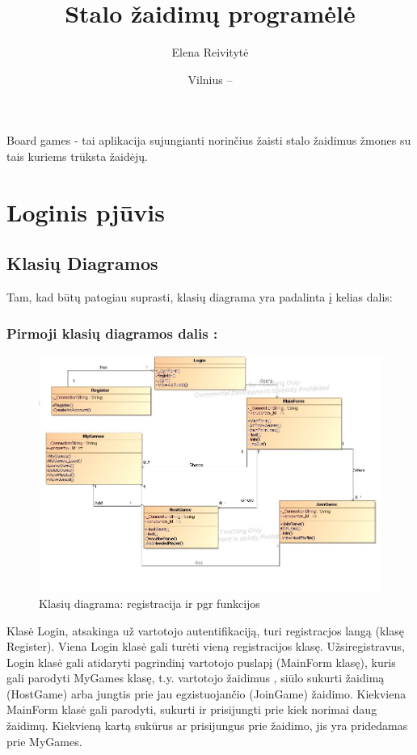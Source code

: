\documentclass{VUMIFPSkursinis}
\title{Stalo žaidimų programėlė}
\author{Elena Reivitytė}
\date{Vilnius – \the\year}
\begin{document}
\maketitle

\tableofcontents

Board games - tai aplikacija sujungianti norinčius žaisti stalo žaidimus žmones
su tais kuriems trūksta žaidėjų.
\section{Loginis pjūvis}
	\subsection{Klasių Diagramos}
			Tam, kad būtų patogiau suprasti, klasių diagrama yra padalinta į kelias dalis:
		\subsubsection*{Pirmoji klasių diagramos dalis :}
			\begin{figure}[H]
				\centering
				\includegraphics[scale=0.5]{img/BoardGamesClassDiagram}
				\caption{Klasių diagrama: registracija ir pgr funkcijos}
				\label{img:BoardGamesClassDiagram}
			\end{figure}
			Klasė Login, atsakinga už vartotojo autentifikaciją, turi  registracjos langą (klasę Register). Viena Login klasė gali turėti vieną   registracijos klasę. Užsiregistravus, Login klasė gali atidaryti pagrindinį vartotojo puslapį (MainForm klasę), kuris gali parodyti MyGames klasę, t.y. vartotojo žaidimus , siūlo sukurti žaidimą (HostGame) arba jungtis prie jau egzistuojančio (JoinGame) žaidimo. Kiekviena MainForm klasė gali parodyti, sukurti ir prisijungti prie kiek norimai daug žaidimų. Kiekvieną kartą sukūrus ar prisijungus prie žaidimo, jis yra pridedamas prie MyGames. 
\end{document}
